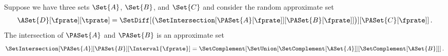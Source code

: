\documentclass[ ../main.tex]{subfiles}
\begin{document}


\begin{example}
Suppose we have three sets $\Set{A}$, $\Set{B}$, and $\Set{C}$ and consider the random approximate set
\begin{equation}
	\ASet{D}[\fprate][\tprate] = 
	\SetDiff[
	\left(
	\SetIntersection[\PASet{A}[\fprate]][\PASet{B}[\fprate]]
	\right)
	]
	[\PASet{C}[\fprate]]\,.
\end{equation}
The intersection of $\PASet{A}$ and $\PASet{B}$ is an approximate set 
\begin{equation}
	\SetIntersection[\PASet{A}][\PASet{B}][\Interval{\fprate}] =
	\SetComplement[\SetUnion[\SetComplement[\ASet{A}]][\SetComplement[\ASet{B}]]]\,.
\end{equation}
\end{example}
\end{document}
